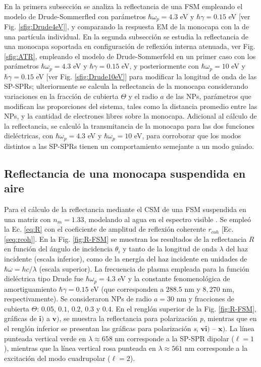  En la primera subsección se analiza la reflectancia de una FSM empleando el modelo de Drude-Sommerfled con parámetros $\hbar\omega_p = 4.3$ eV y  $\hbar\gamma = 0.15$ eV [ver Fig. \ref{sfig:Drude4eV}], y comparando la respuesta EM de la monocapa con la de una partícula individual. En la segunda subsección se estudia la reflectancia de una monocapa soportada en configuración de reflexión interna atenuada, ver Fig. \ref{sfig:ATR}, empleando el modelo de Drude-Sommerfeld en un primer caso con los parámetros  $\hbar\omega_p = 4.3$ eV y  $\hbar\gamma = 0.15$ eV, y posteriormente con $\hbar\omega_p = 10$ eV y $\hbar\gamma = 0.15$ eV [ver Fig. \ref{sfig:Drude10eV}] para modificar la longitud de onda de las SP-SPRs; ulteriormente se calcula la reflectancia de la monocapa considerando  variaciones en la fracción de cubierta $\Theta$ y el radio $a$ de las NPs, parámetros que modifican las proporciones del sistema, tales como la distancia promedio entre las NPs, y la cantidad de electrones libres sobre la monocapa. Adicional al cálculo de la reflectancia, se calculó la transmitancia de la monocapa para las dos funciones dieléctricas, con $\hbar\omega_p =4.3$ eV y $\hbar\omega_p =10$ eV, para corroborar que los modos distintos a las SP-SPRs tienen un comportamiento semejante a un modo guiado. 
	
	\subsection{Reflectancia de una monocapa suspendida en aire}
	\label{ssection:DrudeFSM}
	
	
Para el cálculo de la reflectancia mediante el CSM de una FSM suspendida en una matriz con $n_m=1.33$, modelando al agua en el espectro visible \cite{INDREF}. Se empleó la Ec.  \eqref{eq:R} con el coeficiente de amplitud de reflexión coherente $r_{coh}$ [Ec.  \eqref{seq:rcoh}].  En la Fig.  \ref{fig:R-FSM} se muestran los resultados de la reflectancia $R$ en función del ángulo de incidencia $\theta_i$ y tanto de la longitud de onda $\lambda$ del haz incidente (escala inferior), como de la energía del haz incidente en unidades de $\hbar\omega = h c /\lambda$ (escala superior).  La frecuencia de plasma empleada para la función dieléctrica tipo Drude fue $\hbar\omega_p = 4. 3$ eV y la constante fenomenológica de amortiguamiento $\hbar\gamma = 0. 15$ eV (que corresponden a $288. 5$ nm  y $8,270$ nm, respectivamente). Se consideraron NPs de radio $a=30$ nm y fracciones de cubierta $\Theta$: $0. 05$, $0. 1$, $0. 2$, $0. 3$ y $0. 4$. En el renglón superior de la Fig. \ref{fig:R-FSM}, gráficas de $\mathbf{i)}$ a $\mathbf{v)}$, se muestra la reflectancia para polarización \emph{p}, mientras que en el renglón inferior se presentan las gráficas para polarización \emph{s}, $\mathbf{vi)}$ -- $\mathbf{x)}$. La línea punteada vertical verde  en $\lambda \approx 658$ nm corresponde a la SP-SPR dipolar ($\ell = 1$), mientras que la línea vertical rosa punteada en $\lambda \approx 561$ nm corresponde a la excitación del modo cuadrupolar ($\ell=2$).
					
